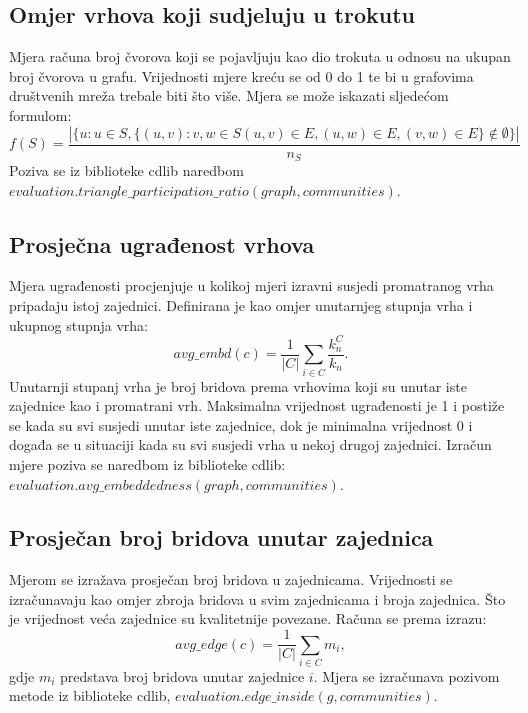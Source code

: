 \documentclass[times, utf8, diplomski]{fer}
\begin{document}
\pagebreak
\subsection{Omjer vrhova koji sudjeluju u trokutu}
Mjera računa broj čvorova koji se pojavljuju kao dio trokuta u odnosu na ukupan broj čvorova u grafu. Vrijednosti mjere kreću se od 0 do 1 te bi u grafovima društvenih mreža trebale biti što više. Mjera se može iskazati sljedećom formulom:
\begin{equation}
	f(S) = \frac{| \{ u : u \in S, \{(u,v):v, w \in S (u,v) \in E, (u,w) \in E, (v,w) \in E \}  \notin \emptyset \} | }{n_{S}}
\end{equation}
Poziva se iz biblioteke cdlib naredbom \\ $evaluation.triangle\_participation\_ratio(graph, communities).$


\subsection{Prosječna ugrađenost vrhova}
Mjera ugrađenosti procjenjuje u kolikoj mjeri izravni susjedi promatranog vrha pripadaju istoj zajednici. Definirana je kao omjer unutarnjeg stupnja vrha i ukupnog stupnja vrha: 
\begin{equation}
	avg\_embd(c) = \frac{1}{|C|} \sum_{i \in C} \frac{k_{n}^{C}}{k_{n}}.
\end{equation}
Unutarnji stupanj vrha je broj bridova prema vrhovima koji su unutar iste zajednice kao i promatrani vrh. Maksimalna vrijednost ugrađenosti je 1 i postiže se kada su svi susjedi unutar iste zajednice, dok je minimalna vrijednost 0 i događa se u situaciji kada su svi susjedi vrha u nekoj drugoj zajednici. Izračun mjere poziva se naredbom iz biblioteke cdlib: $evaluation.avg\_embeddedness(graph,communities)$.


\subsection{Prosječan broj bridova unutar zajednica}
Mjerom se izražava prosječan broj bridova u zajednicama. Vrijednosti se izračunavaju kao omjer zbroja bridova u svim zajednicama i broja zajednica. Što je vrijednost veća zajednice su kvalitetnije povezane. Računa se prema izrazu:
\begin{equation}
	avg\_edge(c) = \frac{1}{|C|} \sum_{i \in C} m_{i},
\end{equation}
gdje $m_i$ predstava broj bridova unutar zajednice $i$. Mjera se izračunava pozivom metode iz biblioteke cdlib, $evaluation.edge\_inside(g,communities)$.
\end{document}
